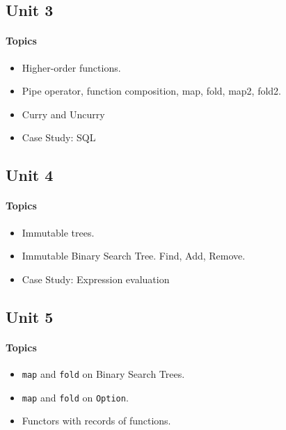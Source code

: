 \subsection*{Unit 3}
\paragraph*{Topics}			
\begin{itemize}[noitemsep]
  \item Higher-order functions.
	\item Pipe operator, function composition, map, fold, map2, fold2.
  \item Curry and Uncurry
  \item Case Study: SQL
\end{itemize}

\subsection*{Unit 4}
\paragraph*{Topics}			
\begin{itemize}[noitemsep]
  \item Immutable trees.
  \item Immutable Binary Search Tree. Find, Add, Remove.
  \item Case Study: Expression evaluation  
\end{itemize}

\subsection*{Unit 5}
\paragraph*{Topics}
\begin{itemize}[noitemsep]
  \item \texttt{map} and \texttt{fold} on Binary Search Trees.
  \item \texttt{map} and \texttt{fold} on \texttt{Option}.  
  \item Functors with records of functions.
\end{itemize}
